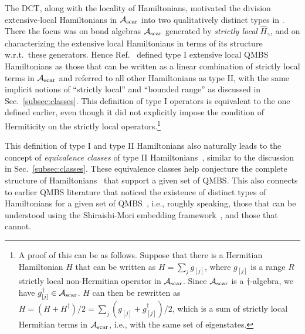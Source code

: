 \documentclass[prx,letterpaper,aps,superscriptaddress,floatfix,twocolumn,nofootinbib]{revtex4-2}
\theoremstyle{definition}
\newcommand{\mA}{\mathcal{A}}
\begin{document}
%
The DCT, along with the locality of Hamiltonians, motivated the division extensive-local Hamiltonians in $\mA_{\rm scar}$ into two qualitatively distinct types in \cite{moudgalya2023exhaustive}.
%
There the focus was on bond algebras $\mA_{\rm scar}$ generated by \textit{strictly local} $\hat{H}_\gamma$, and on characterizing the extensive local Hamiltonians in terms of its structure w.r.t.\ these generators.
%
Hence Ref.~\cite{moudgalya2023exhaustive} defined type I extensive local QMBS Hamiltonians as those that can be written as a linear combination of strictly local terms in $\mA_{\rm scar}$ and referred to all other Hamiltonians as type II, with the same implicit notions of ``strictly local'' and ``bounded range'' as discussed in Sec.~\ref{subsec:classes}.
%
This definition of type I operators is equivalent to the one defined earlier, even though it did not explicitly impose the condition of Hermiticity on the strictly local operators.\footnote{A proof of this can be as follows. Suppose that there is a Hermitian Hamiltonian $H$ that can be written as $H = \sum_j{g_{[j]}}$, where $g_{[j]}$ is a range $R$ strictly local non-Hermitian operator in $\mA_{\rm scar}$.
%
Since $\mA_{\rm scar}$ is a $\dagger$-algebra, we have $g_{[j]}^\dagger \in \mA_{\rm scar}$.
%
$H$ can then be rewritten as $H = (H + H^\dagger)/2 = \sum_j{(g_{[j]} + g_{[j]}^\dagger)/2}$, which is a sum of strictly local Hermitian terms in $\mA_{\rm scar}$, i.e., with the same set of eigenstates.}
%

%
This definition of type I and type II Hamiltonians also naturally leads to the concept of \textit{equivalence classes} of type II Hamiltonians~\cite{moudgalya2023exhaustive}, similar to the discussion in Sec.~\ref{subsec:classes}.
%
These equivalence classes help conjecture the complete structure of Hamiltonians~\cite{moudgalya2023exhaustive, moudgalya2023numerical} that support a given set of QMBS.
%
This also connects to earlier QMBS literature that noticed the existence of distinct types of Hamiltonians for a given set of QMBS~\cite{Moudgalya2020Large, mark2020unified, Mark2020Eta, odea2020from, ren2020quasisymmetry, ren2021deformed, pakrouski2020many, pakrouski2021group}, i.e., roughly speaking, those that can be understood using the Shiraishi-Mori embedding framework~\cite{Shiraishi_2017}, and those that cannot.
%
\end{document}
